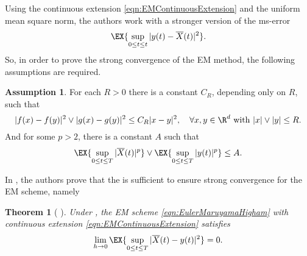 \documentclass[3p]{elsarticle}
\theoremstyle{definition}
\newtheorem{assumption}{Assumption}[section]
\theoremstyle{plain}%
\newtheorem{thm}{Theorem}[section]
\theoremstyle{remark}
\begin{document}
	Using the continuous extension \eqref{eqn:EMContinuousExtension} %
and the uniform mean square norm, the authors work with a stronger version of the ms-error%
$$
	\EX{\sup_{0\leq t \leq t}|y(t)-\overline{X}(t)|^2}.
$$
%
So, in  order to prove the strong convergence of the EM method, the following assumptions are required.
\begin{assumption}\label{ass:HighamAssumption}
	For each $R>0$ there is a constant $C_R$, depending only on $R$, such that
	\begin{equation}\label{ass:LipschitzCondition}
		|f(x)-f(y)|^2 \vee |g(x)-g(y)|^2 \leq C_R|x-y|^2,
		\quad
		\forall x,y\in \R^d 
		\text{ with } |x|\vee |y|\leq R.
	\end{equation}
	And for some $p>2$, there is a constant $A$ such that
	\begin{equation}
		\EX{\sup_{0\leq t\leq T}|\overline{X}(t)|^p}
		\vee
		\EX{\sup_{0\leq t\leq T}|y(t)|^p} \leq A.
	\end{equation}
\end{assumption}
In \cite{Higham2002b}, the authors prove that the  is sufficient to ensure strong 
convergence for the EM scheme, namely 
\begin{thm}[
	{\cite[Thm 2.2]{Higham2002b}}
	]\label{thm:HighamMaoStuart}
	Under , the EM scheme \eqref{eqn:EulerMaruyamaHigham} with continuous extension
	\eqref{eqn:EMContinuousExtension}
	satisfies
	\begin{equation}
		\lim_{h\to 0}
		\EX{\sup_{0\leq t\leq T}|\overline{X}(t)-y(t)|^2}=0.
	\end{equation}
\end{thm}
	
\end{document}
